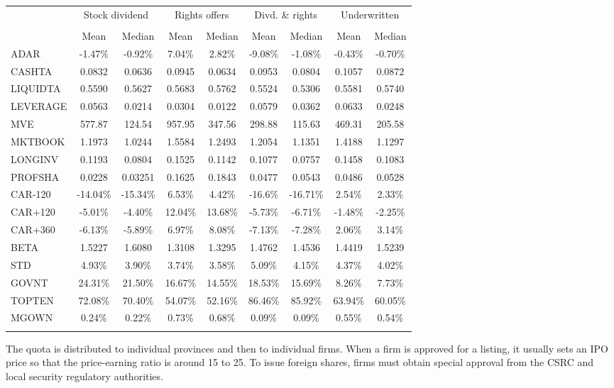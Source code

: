 \documentclass{ws-rv9x6}
\begin{document}
\begin{sidewaystable}	%
{\begin{tabular}{@{}lcccccccc@{}}  
\toprule
& \multicolumn{2}{c}{Stock dividend} & \multicolumn{2}{c}{Rights
offers} &\multicolumn{2}{c}{Divd. \& rights}
&\multicolumn{2}{c}{Underwritten} \\[2pt] 
\cline{2-9} 
& &  &  &  & &  &  &  \\ [-5pt] 
& Mean & Median & Mean & Median & Mean & Median & Mean & Median \\ [2pt] 
\colrule
ADAR & -1.47\% & -0.92\% & 7.04\% & 2.82\% & -9.08\% & -1.08\% &
-0.43\% & -0.70\% \\ [3pt] 
CASHTA & 0.0832 & 0.0636 & 0.0945 &
0.0634 & 0.0953 & 0.0804 & 0.1057 & 0.0872 \\ [3pt] 
LIQUIDTA &
0.5590 & 0.5627 & 0.5683 & 0.5762 & 0.5524 & 0.5306 & 0.5581 &
0.5740 \\ [3pt] 
LEVERAGE & 0.0563 & 0.0214 & 0.0304 & 0.0122 &
0.0579 & 0.0362 & 0.0633 & 0.0248 \\ [3pt] 
MVE & 577.87 & 124.54
& 957.95 & 347.56 & 298.88 & 115.63 & 469.31 & 205.58 \\ [3pt]
MKTBOOK & 1.1973 & 1.0244 & 1.5584 & 1.2493 & 1.2054 & 1.1351 &
1.4188 & 1.1297  \\ [3pt] 
LONGINV & 0.1193 & 0.0804 & 0.1525 &
0.1142 & 0.1077 & 0.0757 & 0.1458 & 0.1083 \\ [3pt] 
PROFSHA &
0.0228 & 0.03251 & 0.1625 & 0.1843 & 0.0477 & 0.0543 & 0.0486 &
0.0528 \\ [3pt] 
CAR-120 & -14.04\% & -15.34\% & 6.53\% & 4.42\%
& -16.6\% & -16.71\% & 2.54\% & 2.33\% \\ [3pt] 
CAR+120 & -5.01\% & -4.40\% & 12.04\% & 13.68\% & -5.73\% & -6.71\% &
-1.48\% & -2.25\% \\ [3pt] 
CAR+360 & -6.13\% & -5.89\% & 6.97\%
& 8.08\% & -7.13\% & -7.28\% & 2.06\% & 3.14\%  \\ [3pt] 
BETA &
1.5227 & 1.6080 & 1.3108 & 1.3295 & 1.4762 & 1.4536 & 1.4419 &
1.5239 \\ [3pt] 
STD & 4.93\% & 3.90\% & 3.74\% & 3.58\% & 5.09\%
& 4.15\% & 4.37\% & 4.02\% \\ [3pt] 
GOVNT & 24.31\% & 21.50\% &
16.67\% & 14.55\% &  18.53\% & 15.69\% & 8.26\% & 7.73\% \\ [3pt]
TOPTEN & 72.08\% & 70.40\% & 54.07\% & 52.16\% & 86.46\% &
85.92\% & 63.94\% & 60.05\% \\ [3pt] 
MGOWN & 0.24\% & 0.22\% &
0.73\% & 0.68\% & 0.09\% & 0.09\% & 0.55\% & 0.54\% \\ [3pt]
\botrule
\end{tabular}}
\begin{tabnote}[Note$:$]  
The quota is distributed to individual provinces and then to
individual firms.  When a firm is approved for a listing, it usually
sets an IPO price so that the price-earning ratio is around 15 to 25.
To issue foreign shares, firms must obtain special approval from the
CSRC and local security regulatory authorities.
\end{tabnote}
\end{sidewaystable}
\end{document}
